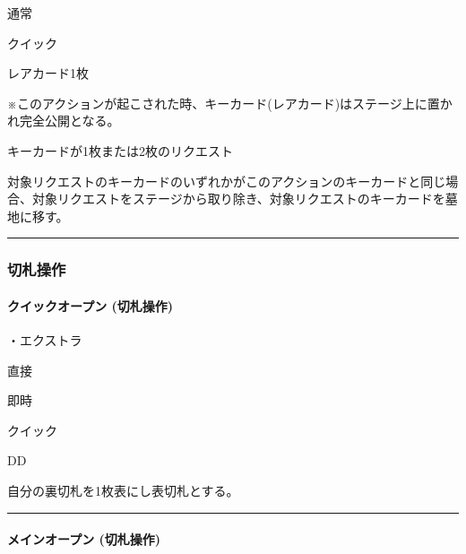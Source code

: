 \documentclass[letterpaper,10pt,dvipdfmx]{sphinxmanual}
\begin{document}
\sphinxAtStartPar
{} 通常

\sphinxAtStartPar
{} クイック

\sphinxAtStartPar
{} レアカード1枚

\sphinxAtStartPar
{} ※このアクションが起こされた時、キーカード(レアカード)はステージ上に置かれ完全公開となる。

\sphinxAtStartPar
{}

\sphinxAtStartPar
キーカードが1枚または2枚のリクエスト

\sphinxAtStartPar
{}

\sphinxAtStartPar
対象リクエストのキーカードのいずれかがこのアクションのキーカードと同じ場合、対象リクエストをステージから取り除き、対象リクエストのキーカードを墓地に移す。


\bigskip\hrule\bigskip



\subsubsection{切札操作}
\label{\detokenize{auto/frameActionlist:id9}}

\paragraph{クイックオープン (切札操作)}
\label{\detokenize{auto/frameActionlist:act-open}}\label{\detokenize{auto/frameActionlist:id10}}
\sphinxAtStartPar
{}

\sphinxAtStartPar
・エクストラ

\sphinxAtStartPar
{} 直接

\sphinxAtStartPar
{} 即時

\sphinxAtStartPar
{} クイック

\sphinxAtStartPar
{} DD

\sphinxAtStartPar
{}

\sphinxAtStartPar
自分の裏切札を1枚表にし表切札とする。


\bigskip\hrule\bigskip



\paragraph{メインオープン (切札操作)}
\label{\detokenize{auto/frameActionlist:id11}}\label{\detokenize{auto/frameActionlist:id12}}
\sphinxAtStartPar
{}
\end{document}
